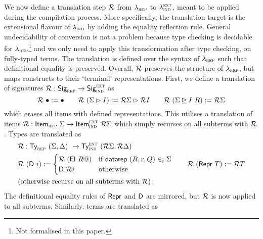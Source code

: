We now define a translation step $\mathcal{R}$ from $\lambda_{\textsc{rep}}$ to
$\lambda_{\textsc{ind}}^{\textsc{ext}}$, meant to be applied during the compilation process.
More specifically, the translation target is the extensional flavour of
$\lambda_{\textsc{ind}}$ by adding the equality reflection rule. General undecidability of
conversion is not a problem because type checking is decidable for
$\lambda_{\textsc{rep}}$\footnote{Not formalised in this paper.} and we only need to apply this
transformation after type checking, on fully-typed terms. The translation is
defined over the syntax of $\lambda_{\textsc{rep}}$ \cite{Boulier2017-cm} such that
definitional equality is preserved. Overall, $\mathcal{R}$ preserves the structure of
$\lambda_{\textsc{rep}}$, but maps constructs to their `terminal' representations.
First, we define a translation of signatures $\mathcal{R} : \textsf{Sig}_{\textsc{rep}} \to \textsf{Sig}_{\textsc{ind}}^\textsc{ext}$ as
\[
\R\ \bullet := \bullet \qquad \R\ (\Sigma \rhd I) := \R \Sigma \rhd \R I \qquad \R\ (\Sigma \unrhd I \ R) := \R \Sigma
\]
which erases all items with defined representations.
This utilises a translation of items $\R : \Item_\rep\ \Sigma \to \Item_\ind^\lang{ext}\ \R
\Sigma$ which simply recurses on all subterms with $\mathcal{R}$.
Types are translated as
\begin{align*}
  & \mathcal{R} : \textsf{Ty}_{\textsc{rep}}\ (\Sigma, \Delta)\ \to \textsf{Ty}_{\textsc{ind}}^\textsc{ext}\ (\mathcal{R} \Sigma, \mathcal{R} \Delta) \\
  & \mathcal{R}\ (\textsf{D}\ i) := \begin{cases}
  \mathcal{R}\ (\textsf{El}\ R@) & \text{if $\textsf{datarep}\ (R, r, Q) \in_i \Sigma$} \\
  \textsf{D}\ \mathcal{R} i & \text{otherwise}
  \end{cases}  \qquad \mathcal{R}\ (\textsf{Repr}\ T) := \mathcal{R} T \\
  & \text{(otherwise recurse on all subterms with $\mathcal{R}$)} \,.
\end{align*}
The definitional equality rules of $\textsf{Repr}$ and $\textsf{D}$ are mirrored, but $\mathcal{R}$ is now applied
to all subterms.
Similarly, terms are translated as

